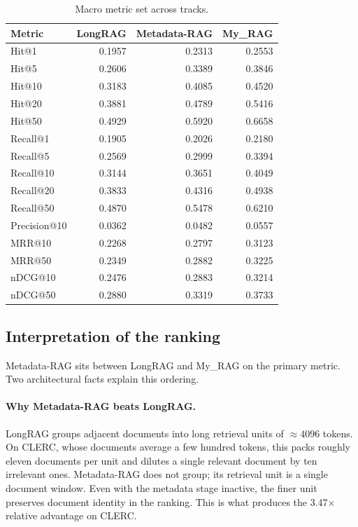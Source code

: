 \documentclass[11pt,a4paper]{article}
\begin{document}
\begin{table}[h]
\centering
\caption{Macro metric set across tracks.}
\label{tab:threefull}
\small
\begin{tabular}{l r r r}
\toprule
\textbf{Metric} & \textbf{LongRAG} & \textbf{Metadata-RAG}
  & \textbf{My\_RAG} \\
\midrule
Hit@1     & \num{0.1957} & \num{0.2313} & \num{0.2553} \\
Hit@5     & \num{0.2606} & \num{0.3389} & \num{0.3846} \\
Hit@10    & \num{0.3183} & \num{0.4085} & \num{0.4520} \\
Hit@20    & \num{0.3881} & \num{0.4789} & \num{0.5416} \\
Hit@50    & \num{0.4929} & \num{0.5920} & \num{0.6658} \\
Recall@1  & \num{0.1905} & \num{0.2026} & \num{0.2180} \\
Recall@5  & \num{0.2569} & \num{0.2999} & \num{0.3394} \\
Recall@10 & \num{0.3144} & \num{0.3651} & \num{0.4049} \\
Recall@20 & \num{0.3833} & \num{0.4316} & \num{0.4938} \\
Recall@50 & \num{0.4870} & \num{0.5478} & \num{0.6210} \\
Precision@10 & \num{0.0362} & \num{0.0482} & \num{0.0557} \\
MRR@10    & \num{0.2268} & \num{0.2797} & \num{0.3123} \\
MRR@50    & \num{0.2349} & \num{0.2882} & \num{0.3225} \\
nDCG@10   & \num{0.2476} & \num{0.2883} & \num{0.3214} \\
nDCG@50   & \num{0.2880} & \num{0.3319} & \num{0.3733} \\
\bottomrule
\end{tabular}
\end{table}

\subsection{Interpretation of the ranking}
Metadata-RAG sits between LongRAG and My\_RAG on the primary metric.
Two architectural facts explain this ordering.

\paragraph{Why Metadata-RAG beats LongRAG.}
LongRAG groups adjacent documents into long retrieval units of
$\approx\num{4096}$ tokens. On CLERC, whose documents average a few
hundred tokens, this packs roughly eleven documents per unit and
dilutes a single relevant document by ten irrelevant ones. Metadata-RAG
does not group; its retrieval unit is a single document window. Even
with the metadata stage inactive, the finer unit preserves document
identity in the ranking. This is what produces the \num{3.47}$\times$
relative advantage on CLERC.
\end{document}
